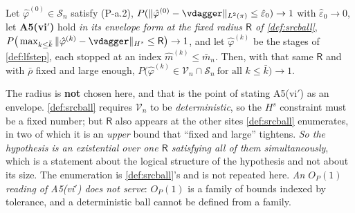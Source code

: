 \begin{lemma}\label{lem:pathcont}
Let $\hat\varphi^{(0)}\in\mathcal S_n$ satisfy (P-a.2), $P(\|\hat\varphi^{(0)}-\vdagger\|_{L^{2}(\pi)}\le\hat\varepsilon_0)\to1$
with $\hat\varepsilon_0\to0$, let \textbf{A5(vi$'$)} hold \emph{in its envelope form at the fixed radius
$\mathsf R$ of \cref{def:srcball}}, 
$P\big(\max_{k\le\bar k}\|\hat\varphi^{(k)}-\vdagger\|_{H^{s}}\le\mathsf R\big)\to1$, and let
$\hat\varphi^{(k)}$ be the stages of \cref{def:lfstep}, each stopped at an index
$\hat m^{(k)}\le\bar m_n$. Then, with that same $\mathsf R$ and with $\bar\rho$ fixed and large enough,
$P\big(\hat\varphi^{(k)}\in\mathcal V_n\cap\mathcal S_n\ \text{for all }k\le\bar k\big)\to1$.

The radius is \textbf{not} chosen here, and that is the point of stating A5(vi$'$) as an envelope.
\cref{def:srcball} requires $\mathcal V_n$ to be \emph{deterministic}, so the $H^{s}$ constraint must be
a fixed number; but $\mathsf R$ also appears at the other sites \cref{def:srcball} enumerates, in two of
which it is an \emph{upper} bound that ``fixed and large'' tightens.
\emph{So the hypothesis is an existential over one $\mathsf R$ satisfying all of them simultaneously},
which is a statement about the logical structure of the hypothesis and not about its size.
The enumeration is \cref{def:srcball}'s and is not repeated here. \emph{An $O_P(1)$ reading of
A5(vi$'$) does
not serve}: $O_P(1)$ is a family of bounds indexed by tolerance, and a deterministic ball cannot be
defined from a family.


\end{lemma}
